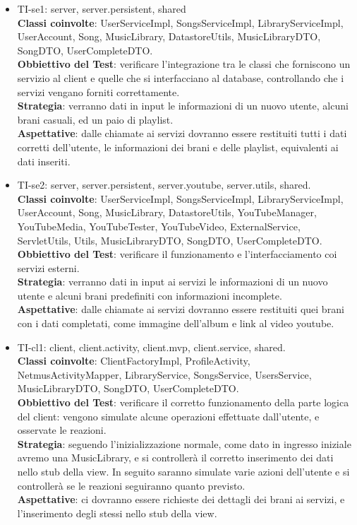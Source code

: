 \begin{itemize}

\item TI-se1: server, server.persistent, shared\\
\textbf{Classi coinvolte}: UserServiceImpl, SongsServiceImpl,
LibraryServiceImpl, UserAccount, Song, MusicLibrary, DatastoreUtils,
MusicLibraryDTO, SongDTO, UserCompleteDTO.\\ 
\textbf{Obbiettivo del Test}: verificare l'integrazione tra le classi che
forniscono un servizio al client e quelle che si interfacciano al database,
controllando che i servizi vengano forniti correttamente.\\ 
\textbf{Strategia}: verranno dati in input le informazioni di un nuovo utente,
alcuni brani casuali, ed un paio di playlist. \\
\textbf{Aspettative}: dalle chiamate ai servizi dovranno essere restituiti
tutti i dati corretti dell'utente, le informazioni dei brani e delle playlist,
equivalenti ai dati inseriti.\\

\item TI-se2: server, server.persistent, server.youtube, server.utils, shared.\\
\textbf{Classi coinvolte}: UserServiceImpl, SongsServiceImpl,
LibraryServiceImpl, UserAccount, Song, MusicLibrary, DatastoreUtils,
YouTubeManager, YouTubeMedia, YouTubeTester, YouTubeVideo, ExternalService,
ServletUtils, Utils, MusicLibraryDTO, SongDTO, UserCompleteDTO.\\ 
\textbf{Obbiettivo del Test}: verificare il funzionamento e
l'interfacciamento coi servizi esterni.\\
\textbf{Strategia}: verranno dati in input ai servizi le informazioni di un
nuovo utente e alcuni brani predefiniti con informazioni incomplete.\\
\textbf{Aspettative}: dalle chiamate ai servizi dovranno essere
restituiti quei brani con i dati completati, come immagine dell'album e link al
video youtube.\\

\item TI-cl1: client, client.activity, client.mvp, client.service, shared.\\ 
\textbf{Classi coinvolte}: ClientFactoryImpl, ProfileActivity,
NetmusActivityMapper, LibraryService, SongsService, UsersService,
MusicLibraryDTO, SongDTO, UserCompleteDTO.\\
\textbf{Obbiettivo del Test}: verificare il corretto funzionamento della
parte logica del client: vengono simulate alcune operazioni effettuate
dall'utente, e osservate le reazioni.\\
\textbf{Strategia}: seguendo l'inizializzazione normale, come dato
in ingresso iniziale avremo una MusicLibrary, e si controller\`a il corretto
inserimento dei dati nello stub della view. In seguito saranno simulate varie
azioni dell'utente e si controller\`a se le reazioni seguiranno quanto
previsto.\\
\textbf{Aspettative}: ci dovranno essere richieste dei dettagli dei brani ai
servizi, e l'inserimento degli stessi nello stub della view.\\


\end{itemize}
